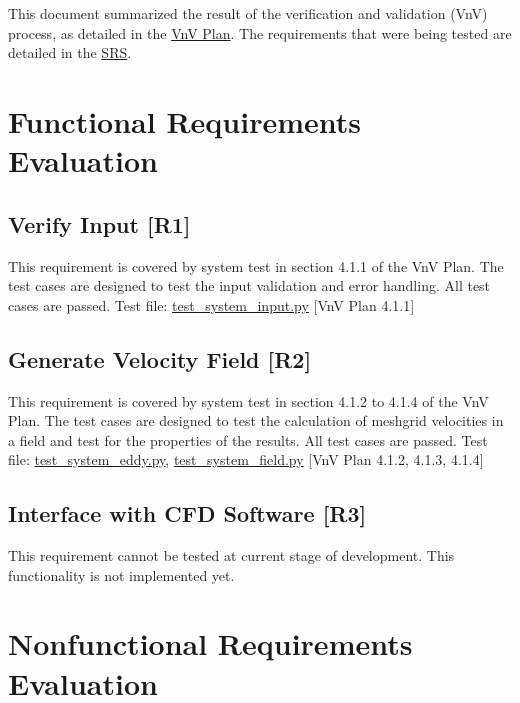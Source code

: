 \documentclass[12pt, titlepage]{article}
\begin{document}
\newpage


This document summarized the result of the verification and validation (VnV) process, as detailed in the \href{https://github.com/omltcat/turbulent-flow/blob/main/docs/VnVPlan/VnVPlan.pdf}{VnV Plan}. The requirements that were being tested are detailed in the \href{https://github.com/omltcat/turbulent-flow/blob/main/docs/SRS/SRS.pdf}{SRS}.

\section{Functional Requirements Evaluation}

\subsection{Verify Input [R1]} \label{ST:Input}
This requirement is covered by system test in section 4.1.1 of the VnV Plan. The test cases are designed to test the input validation and error handling. All test cases are passed. Test file: \href{https://github.com/omltcat/turbulent-flow/blob/main/test/system/test_system_input.py}{test\_system\_input.py} [VnV Plan 4.1.1]

\subsection{Generate Velocity Field [R2]} \label{ST:FieldGen}
This requirement is covered by system test in section 4.1.2 to 4.1.4 of the VnV Plan. The test cases are designed to test the calculation of meshgrid velocities in a field and test for the properties of the results. All test cases are passed. Test file: \href{https://github.com/omltcat/turbulent-flow/blob/main/test/system/test_system_eddy.py}{test\_system\_eddy.py}, \href{https://github.com/omltcat/turbulent-flow/blob/main/test/system/test_system_field.py}{test\_system\_field.py} [VnV Plan 4.1.2, 4.1.3, 4.1.4]

\subsection{Interface with CFD Software [R3]}
This requirement cannot be tested at current stage of development. This functionality is not implemented yet.

\section{Nonfunctional Requirements Evaluation}
\end{document}
